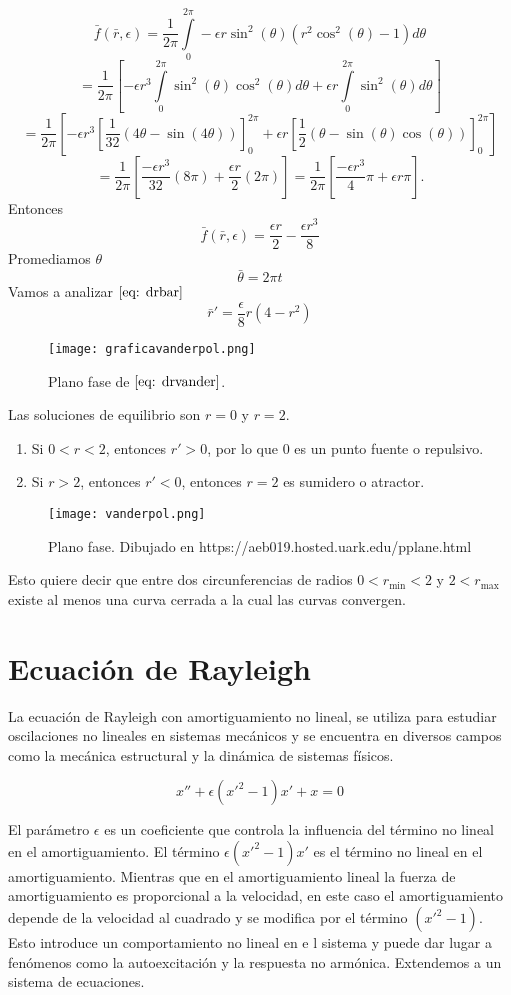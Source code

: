$$\bar{f}(\bar{r},\epsilon)=\frac{1}{2\pi}\int\limits_0^{2\pi}-\epsilon r\sin^2(\theta)(r^2\cos^2(\theta)-1)d\theta$$
$$=\frac{1}{2\pi}[-\epsilon r^3\int\limits_0^{2\pi}\sin^2(\theta)\cos^2(\theta)d\theta+\epsilon r\int\limits_0^{2\pi}\sin^2(\theta)d\theta]$$
$$=\frac{1}{2\pi}[-\epsilon r^3[\frac{1}{32}(4\theta-\sin(4\theta))]_0^{2\pi}+\epsilon r[\frac{1}{2}(\theta-\sin(\theta)\cos(\theta))]_0^{2\pi}]$$
$$=\frac{1}{2\pi}[\frac{-\epsilon r^3}{32}(8\pi)+\frac{\epsilon r}{2}(2\pi)]=\frac{1}{2\pi}[\frac{-\epsilon r^3}{4}\pi+\epsilon r\pi].$$
Entonces
$$\bar{f}(\bar{r},\epsilon)=\frac{\epsilon r}{2}-\frac{\epsilon r^3}{8}$$
Promediamos $\theta$
$$\bar{\theta}=2\pi t$$
Vamos a analizar $\eqref{eq: drbar}$
\begin{equation}\label{eq: drvander}
	\bar{r}'=\frac{\epsilon}{8}r(4-r^2)
\end{equation}
\begin{figure}[h]
	\centering
	\texttt{[image: graficavanderpol.png]}
	\caption{Plano fase de $\eqref{eq: drvander}$.}
\end{figure}
Las soluciones de equilibrio son $r=0$ y $r=2$.
\begin{enumerate}
	\item Si $0<r<2$, entonces $r'>0$, por lo que $0$ es un punto fuente o repulsivo.
	\item Si $r>2$, entonces $r'<0$, entonces $r=2$ es sumidero o atractor.
\end{enumerate}

\begin{figure}[h]
	\centering
	\texttt{[image: vanderpol.png]}
	\caption{Plano fase. Dibujado en https://aeb019.hosted.uark.edu/pplane.html}
\end{figure}

Esto quiere decir que entre dos circunferencias de radios $0<r_{\min}<2$ y $2<r_{\max}$ existe al menos una curva cerrada a la cual las curvas convergen.

\section{Ecuación de Rayleigh}
La ecuación de Rayleigh con amortiguamiento no lineal, se utiliza
para estudiar oscilaciones no lineales en sistemas mecánicos y se encuentra en
diversos campos como la mecánica estructural y la dinámica de sistemas físicos.

$$x''+\epsilon(x'^2-1)x'+x=0$$

El parámetro $\epsilon$ es un coeficiente que controla la influencia del término no lineal en el amortiguamiento.
El término $\epsilon(x'^2 - 1)x'$ es el término no lineal en el amortiguamiento. Mientras que en el amortiguamiento
lineal la fuerza de amortiguamiento es proporcional a la velocidad, en este caso el amortiguamiento depende de
la velocidad al cuadrado y se modifica por el término $(x'^2 - 1)$. Esto introduce un comportamiento no lineal en e
l sistema y puede dar lugar a fenómenos como la autoexcitación y la respuesta no armónica.
Extendemos a un sistema de ecuaciones.


